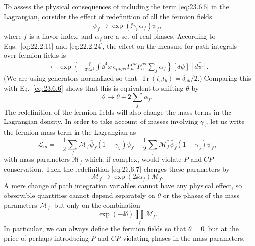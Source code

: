To assess the physical consequences of including the term
\eqref{eq:23.6.6} in the Lagrangian, consider the effect of redefinition
of all the fermion fields
\begin{equation}
\psi_f\longrightarrow\exp(\ii\gamma_5\alpha_f)\psi_f,
\tag{23.6.7}\label{eq:23.6.7}
\end{equation}
where $f$ is a flavor index, and $\alpha_f$ are a set of real phases.
According to Eqs.~\eqref{eq:22.2.10} and \eqref{eq:22.2.24}, the effect
on the measure for path integrals over fermion fields is
\begin{align}
[d\psi][d\bar\psi]\longrightarrow{}&
\exp\left\{-\frac{\ii}{32\pi^2}\int \dd^4x\,
\epsilon_{\mu\nu\rho\sigma}F_a^{\mu\nu}F_a^{\rho\sigma}
\sum_f\alpha_f\right\}
[d\psi][d\bar\psi].
\tag{23.6.8}\label{eq:23.6.8}
\end{align}
(We are using generators normalized so that
$\operatorname{Tr}(t_a t_b)=\delta_{ab}/2$.)
Comparing this with Eq.~\eqref{eq:23.6.6} shows that this is equivalent
to shifting $\theta$ by
\begin{equation}
\theta\longrightarrow\theta+2\sum_f\alpha_f.
\tag{23.6.9}\label{eq:23.6.9}
\end{equation}
The redefinition of the fermion fields will also change the mass terms in
the Lagrangian density. In order to take account of masses involving
$\gamma_5$, let us write the fermion mass term in the Lagrangian as
\begin{equation}
\mathcal L_m=-\frac12\sum_f\mathcal M_f\bar\psi_f(1+\gamma_5)\psi_f
-\frac12\sum_f\mathcal M_f^*\bar\psi_f(1-\gamma_5)\psi_f,
\tag{23.6.10}\label{eq:23.6.10}
\end{equation}
with mass parameters $\mathcal M_f$ which, if complex, would violate
$P$ and $CP$ conservation. Then the redefinition \eqref{eq:23.6.7}
changes these parameters by
\begin{equation}
\mathcal M_f\longrightarrow\exp(2\ii\alpha_f)\mathcal M_f.
\tag{23.6.11}\label{eq:23.6.11}
\end{equation}
A mere change of path integration variables cannot have any physical
effect, so observable quantities cannot depend separately on $\theta$ or
the phases of the mass parameters $\mathcal M_f$, but only on the
combination
\begin{equation}
\exp(-\ii\theta)\prod_f\mathcal M_f.
\tag{23.6.12}\label{eq:23.6.12}
\end{equation}
In particular, we can always define the fermion fields so that $\theta=0$,
but at the price of perhaps introducing $P$ and $CP$ violating phases in
the mass parameters.

